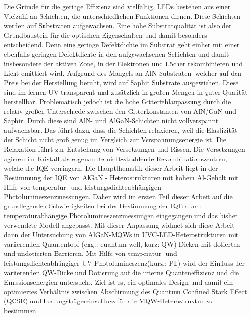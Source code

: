 Die Gründe für die geringe Effizienz sind vielfältig. LEDs bestehen aus einer Vielzahl an Schichten, die unterschiedlichen Funktionen dienen. Diese Schichten werden auf Substraten aufgewachsen. Eine hohe Substratqualität ist also der Grundbaustein für die optischen Eigenschaften und damit besonders entscheidend. Denn eine geringe Defektdichte im Substrat geht einher mit einer ebenfalls geringen Defektdichte in den aufgewachsenen Schichten und damit insbesondere der aktiven Zone, in der Elektronen und Löcher rekombinieren und Licht emittiert wird.
\newline
Aufgrund des Mangels an AlN-Substraten, welcher auf den Preis bei der Herstellung beruht, wird auf Saphir Substrate ausgewichen. Diese sind im fernen UV transparent und zusätzlich in großen Mengen in guter Qualität herstellbar. Problematisch jedoch ist die hohe Gitterfehlanpassung durch die relativ großen Unterschiede zwischen den Gitterkonstanten von AlN/GaN und Saphir. Durch diese sind AlN- und AlGaN-Schichten nicht vollverspannt aufwachsbar. Das führt dazu, dass die Schichten relaxieren, weil die Elastizität der Schicht nicht groß genug im Vergleich zur Verspannungsenergie ist. Die Relaxation führt zur Entstehung von Versetzungen und Rissen. Die Versetzungen agieren im Kristall als sogenannte nicht-strahlende Rekombinationszentren, welche die IQE verringern. 
\newline
Die Hauptthematik dieser Arbeit liegt in der Bestimmung der IQE von AlGaN - Heterostrukturen mit hohem Al-Gehalt mit Hilfe von temperatur- und leistungsdichteabhängigen Photolumineszenzmessungen.
Daher wird im ersten Teil dieser Arbeit auf die grundlegenden Schwierigkeiten bei der Bestimmung der IQE durch temperaturabhängige Photolumineszenzmessungen eingegangen und das bisher verwendete Modell angepasst. 
\newline
Mit dieser Anpassung widmet sich diese Arbeit dann der Untersuchung von AlGaN-MQWs in UVC-LED-Heterostrukturen mit variierenden Quantentopf (eng.: quantum well, kurz: QW)-Dicken mit dotierten und undotierten Barrieren. Mit Hilfe von temperatur- und leistungsdichteabhängiger UV-Photolumineszenz(kurz.: PL) wird der Einfluss der variierenden QW-Dicke und Dotierung auf die interne Quanteneffizienz und die Emissionsenergien untersucht. Ziel ist es, ein optimales Design und damit ein optimiertes Verhältnis zwischen Abschirmung des Quantum Confined Stark Effect (QCSE) und Ladungsträgereinschluss für die MQW-Heterostruktur zu bestimmen.
\newline

